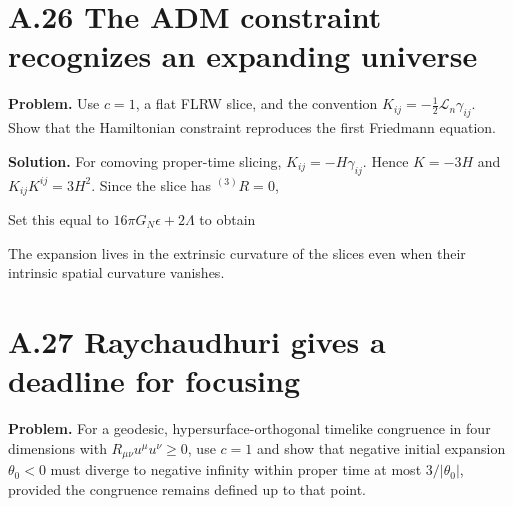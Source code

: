 \documentclass[
  11pt,
  letterpaper,
  oneside,
  openany]{scrbook}
\begin{document}
\hypertarget{a.26-the-adm-constraint-recognizes-an-expanding-universe}{%
\section{A.26 The ADM constraint recognizes an expanding
universe}\label{a.26-the-adm-constraint-recognizes-an-expanding-universe}}

\textbf{Problem.} Use \(c=1\), a flat FLRW slice, and the convention
\(K_{ij}=-\tfrac12\mathcal L_n\gamma_{ij}\). Show that the Hamiltonian
constraint reproduces the first Friedmann equation.

\textbf{Solution.} For comoving proper-time slicing,
\(K_{ij}=-H\gamma_{ij}\). Hence \(K=-3H\) and \(K_{ij}K^{ij}=3H^2\).
Since the slice has \({}^{(3)}R=0\),

\begin{center}
\begingroup
{}
\ifdim\wd\grmathbox>\linewidth
\resizebox{\linewidth}{!}{\usebox{\grmathbox}}
\else\usebox{\grmathbox}\fi
\endgroup
\end{center}

Set this equal to \(16\pi G_N\epsilon+2\Lambda\) to obtain

\begin{center}
\begingroup
{}
\ifdim\wd\grmathbox>\linewidth
\resizebox{\linewidth}{!}{\usebox{\grmathbox}}
\else\usebox{\grmathbox}\fi
\endgroup
\end{center}

The expansion lives in the extrinsic curvature of the slices even when
their intrinsic spatial curvature vanishes.

\hypertarget{a.27-raychaudhuri-gives-a-deadline-for-focusing}{%
\section{A.27 Raychaudhuri gives a deadline for
focusing}\label{a.27-raychaudhuri-gives-a-deadline-for-focusing}}

\textbf{Problem.} For a geodesic, hypersurface-orthogonal timelike
congruence in four dimensions with \(R_{\mu\nu}u^\mu u^\nu\ge0\), use
\(c=1\) and show that negative initial expansion \(\theta_0<0\) must
diverge to negative infinity within proper time at most
\(3/|\theta_0|\), provided the congruence remains defined up to that
point.
\end{document}
